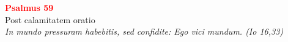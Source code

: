 


\def\greinitialformat#1{%
{\fontsize{39}{39}\selectfont #1}%
}




\vspace{0.3cm}
\begin{center}
 \textcolor{red}{\large \bf Psalmus 59}\\
Post calamitatem oratio\\
\textit{\small In mundo pressuram habebitis, sed confidite: Ego vici mundum. (Io 16,33)}
\end{center}
